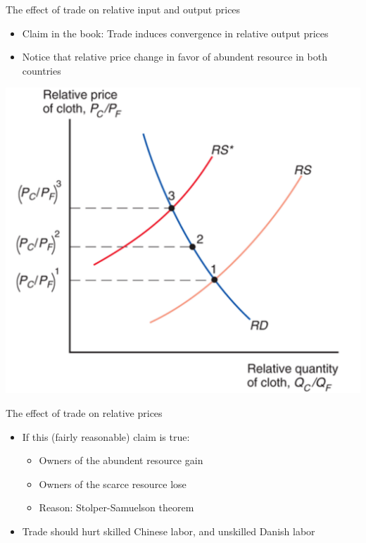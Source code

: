 \documentclass[ignorenonframetext,]{beamer}
\begin{document}
\begin{frame}{The effect of trade on relative input and output prices}

    \begin{itemize}
            \item Claim in the book: Trade induces convergence in relative output prices
            \item Notice that relative price change in favor of abundent resource in both countries
    \end{itemize}
    \includegraphics[scale=0.2]{trade_price_convergence.png}
\end{frame}

\begin{frame}{The effect of trade on relative prices}

    \begin{itemize} 
         \item If this (fairly reasonable) claim is true:
             \begin{itemize}
                \item Owners of the abundent resource gain
                \item Owners of the scarce resource lose
                \item Reason: Stolper-Samuelson theorem
            \end{itemize}
         \item Trade should hurt skilled Chinese labor, and unskilled Danish labor
    \end{itemize}

\end{frame}
\end{document}
